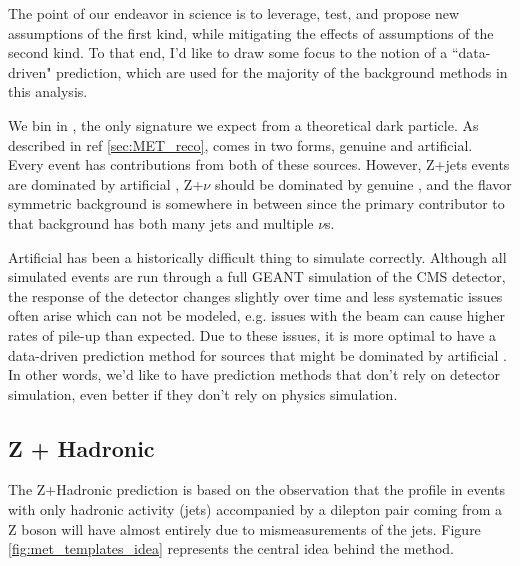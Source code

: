     The point of our endeavor in science is to leverage, test, and propose new assumptions of the first kind, while mitigating the effects of assumptions of the second kind. To that end, I'd like to draw some focus to the notion of a ``data-driven" prediction, which are used for the majority of the background methods in this analysis.

    We bin in \MET, the only signature we expect from a theoretical dark particle. As described in ref \ref{sec:MET_reco}, \MET comes in two forms, genuine and artificial. Every event has contributions from both of these sources. However, Z+jets events are dominated by artificial \MET, Z+$\nu$ should be dominated by genuine \MET, and the flavor symmetric background is somewhere in between since the primary contributor to that background has both many jets and multiple $\nu$s.

    Artificial \MET has been a historically difficult thing to simulate correctly. Although all simulated events are run through a full GEANT simulation of the CMS detector, the response of the detector changes slightly over time and less systematic issues often arise which can not be modeled, e.g. issues with the beam can cause higher rates of pile-up than expected.  Due to these issues, it is more optimal to have a data-driven prediction method for sources that might be dominated by artificial \MET. In other words, we'd like to have prediction methods that don't rely on detector simulation, even better if they don't rely on physics simulation. 

  \subsection{Z + Hadronic} \label{sec:z_+_hadronic}
    The Z+Hadronic prediction is based on the observation that the \MET profile in events with only hadronic activity (jets) accompanied by a dilepton pair coming from a Z boson will have \MET almost entirely due to mismeasurements of the jets. Figure \ref{fig:met_templates_idea} represents the central idea behind the method. 

